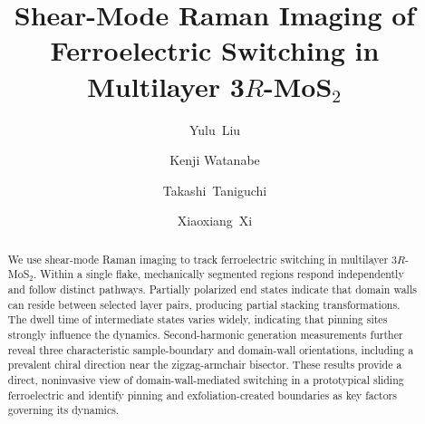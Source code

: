\documentclass[
reprint,
superscriptaddress,









 amsmath,amssymb,
 aps,
 prb,






]{revtex4-2}
\begin{document}
\title{Shear-Mode Raman Imaging of Ferroelectric Switching in Multilayer 3$R$-MoS$_2$}

\author{Yulu~Liu}

\author{Kenji Watanabe}

\author{Takashi~Taniguchi}

\author{Xiaoxiang~Xi}



\begin{abstract}
We use shear-mode Raman imaging to track ferroelectric switching in multilayer 3$R$-MoS$_2$. Within a single flake, mechanically segmented regions respond independently and follow distinct pathways. Partially polarized end states indicate that domain walls can reside between selected layer pairs, producing partial stacking transformations. The dwell time of intermediate states varies widely, indicating that pinning sites strongly influence the dynamics. Second-harmonic generation measurements further reveal three characteristic sample-boundary and domain-wall orientations, including a prevalent chiral direction near the zigzag-armchair bisector. These results provide a direct, noninvasive view of domain-wall-mediated switching in a prototypical sliding ferroelectric and identify pinning and exfoliation-created boundaries as key factors governing its dynamics.
\end{abstract}


\maketitle
\end{document}
